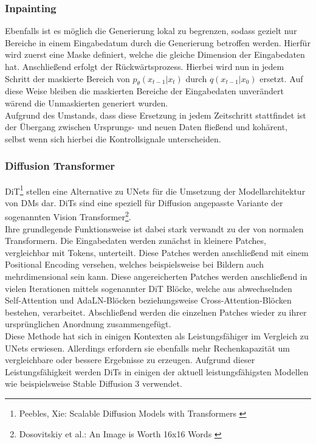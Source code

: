 \subsubsection{Inpainting}

Ebenfalls ist es möglich die Generierung lokal zu begrenzen, sodass gezielt nur Bereiche in einem Eingabedatum durch die Generierung betroffen werden. Hierfür wird zuerst eine Maske definiert, welche die gleiche Dimension der Eingabedaten hat. Anschließend erfolgt der Rückwärtsprozess. Hierbei wird nun in jedem Schritt der maskierte Bereich von $p_\theta(x_{t-1} | x_{t})$ durch $q(x_{t-1}|x_0)$ ersetzt. Auf diese Weise bleiben die maskierten Bereiche der Eingabedaten unverändert wärend die Unmaskierten generiert wurden. \\
Aufgrund des Umstands, dass diese Ersetzung in jedem Zeitschritt stattfindet ist der Übergang zwischen Ursprungs- und neuen Daten fließend und kohärent, selbst wenn sich hierbei die Kontrollsignale unterscheiden.

\subsubsection{Diffusion Transformer}

\ac{DiT}\footnote{
    Peebles, Xie: Scalable Diffusion Models with Transformers
    \cite{peebles2023scalable}
} stellen eine Alternative zu UNets für die Umsetzung der Modellarchitektur von \ac{DM}s dar. \ac{DiT}s sind eine speziell für Diffusion angepasste Variante der sogenannten Vision Transformer\footnote{
    Dosovitskiy et al.: An Image is Worth 16x16 Words 
    \cite{dosovitskiy2021imageworth16x16words}
}.\\
Ihre grundlegende Funktionsweise ist dabei stark verwandt zu der von normalen Transformern. Die Eingabedaten werden zunächst in kleinere Patches, vergleichbar mit Tokens, unterteilt. Diese Patches werden anschließend mit einem Positional Encoding versehen, welches beispielsweise bei Bildern auch mehrdimensional sein kann. Diese angereicherten Patches werden anschließend in vielen Iterationen mittels sogenannter \ac{DiT} Blöcke, welche aus abwechselnden Self-Attention und AdaLN-Blöcken beziehungsweise Cross-Attention-Blöcken bestehen, verarbeitet. Abschließend werden die einzelnen Patches wieder zu ihrer ursprünglichen Anordnung zusammengefügt. \\
Diese Methode hat sich in einigen Kontexten als Leistungsfähiger im Vergleich zu UNets erwiesen. Allerdings erfordern sie ebenfalls mehr Rechenkapazität um vergleichbare oder bessere Ergebnisse zu erzeugen. Aufgrund dieser Leistungsfähigkeit werden \ac{DiT}s in einigen der aktuell leistungsfähigsten Modellen wie beispielsweise Stable Diffusion 3 verwendet.


